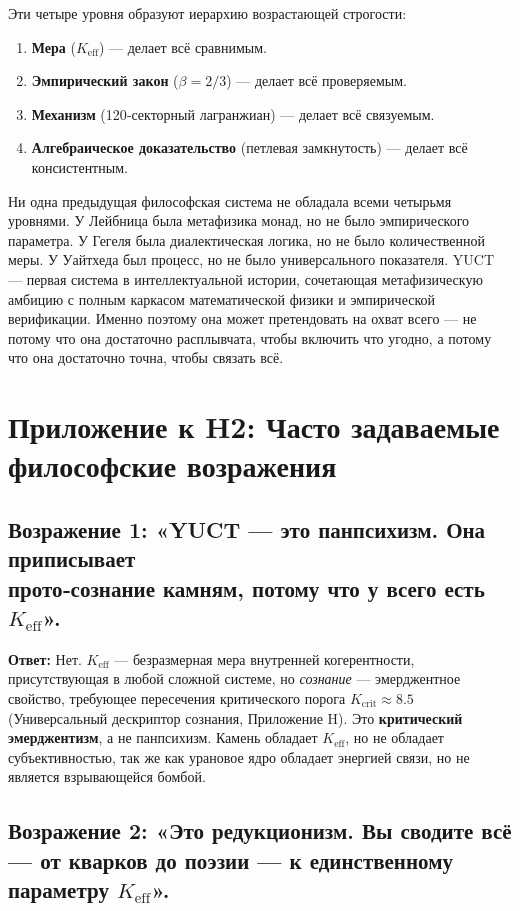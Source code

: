 \documentclass[12pt,a4paper]{article}
\begin{document}
	Эти четыре уровня образуют иерархию возрастающей строгости:
	\begin{enumerate}[leftmargin=*]
		\item \textbf{Мера} (\(K_{\mathrm{eff}}\)) — делает всё сравнимым.
		\item \textbf{Эмпирический закон} (\(\beta = 2/3\)) — делает всё проверяемым.
		\item \textbf{Механизм} (120‑секторный лагранжиан) — делает всё связуемым.
		\item \textbf{Алгебраическое доказательство} (петлевая замкнутость) — делает всё консистентным.
	\end{enumerate}
	Ни одна предыдущая философская система не обладала всеми четырьмя уровнями. У Лейбница была метафизика монад, но не было эмпирического параметра. У Гегеля была диалектическая логика, но не было количественной меры. У Уайтхеда был процесс, но не было универсального показателя. YUCT — первая система в интеллектуальной истории, сочетающая метафизическую амбицию с полным каркасом математической физики и эмпирической верификации. Именно поэтому она может претендовать на охват всего — не потому что она достаточно расплывчата, чтобы включить что угодно, а потому что она достаточно точна, чтобы связать всё.
	
	\section*{Приложение к H2: Часто задаваемые философские возражения}
	
	\subsection*{Возражение 1: «YUCT — это панпсихизм. Она приписывает \\ прото‑сознание камням, потому что у всего есть \(K_{\mathrm{eff}}\)».}
	
	\textbf{Ответ:} Нет. \(K_{\mathrm{eff}}\) — безразмерная мера внутренней когерентности, присутствующая в любой сложной системе, но \emph{сознание} — эмерджентное свойство, требующее пересечения критического порога \(K_{\mathrm{crit}} \approx 8.5\) (Универсальный дескриптор сознания, Приложение H). Это \textbf{критический эмерджентизм}, а не панпсихизм. Камень обладает \(K_{\mathrm{eff}}\), но не обладает субъективностью, так же как урановое ядро обладает энергией связи, но не является взрывающейся бомбой.
	
	\subsection*{Возражение 2: «Это редукционизм. Вы сводите всё — от кварков до поэзии — к единственному параметру \(K_{\mathrm{eff}}\)».}
	
\end{document}
